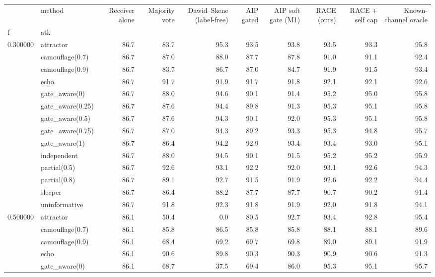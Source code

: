 \begin{tabular}{llrrrrrrrr}
\toprule
 & method & Receiver alone & Majority vote & Dawid–Skene (label-free) & AIP gated & AIP soft gate (M1) & RACE (ours) & RACE + self cap & Known-channel oracle \\
f & atk &  &  &  &  &  &  &  &  \\
\midrule
\multirow[t]{14}{*}{0.300000} & attractor & 86.7 & 83.7 & 95.3 & 93.5 & 93.8 & 93.5 & 93.3 & 95.8 \\
 & camouflage(0.7) & 86.7 & 87.0 & 88.0 & 87.7 & 87.8 & 91.0 & 91.1 & 92.4 \\
 & camouflage(0.9) & 86.7 & 83.7 & 86.7 & 87.0 & 84.7 & 91.9 & 91.5 & 93.4 \\
 & echo & 86.7 & 91.7 & 91.9 & 91.7 & 91.8 & 92.1 & 92.1 & 92.6 \\
 & gate\_aware(0) & 86.7 & 88.0 & 94.6 & 90.1 & 91.4 & 95.2 & 95.0 & 95.8 \\
 & gate\_aware(0.25) & 86.7 & 87.6 & 94.4 & 89.8 & 91.3 & 95.3 & 95.1 & 95.8 \\
 & gate\_aware(0.5) & 86.7 & 87.6 & 94.3 & 90.1 & 92.0 & 95.3 & 95.1 & 95.8 \\
 & gate\_aware(0.75) & 86.7 & 87.0 & 94.3 & 89.2 & 93.3 & 95.3 & 94.8 & 95.7 \\
 & gate\_aware(1) & 86.7 & 86.4 & 94.2 & 92.9 & 93.4 & 93.4 & 93.0 & 95.1 \\
 & independent & 86.7 & 88.0 & 94.5 & 90.1 & 91.5 & 95.2 & 95.2 & 95.9 \\
 & partial(0.5) & 86.7 & 92.6 & 93.1 & 92.2 & 92.0 & 93.1 & 92.6 & 94.3 \\
 & partial(0.8) & 86.7 & 89.1 & 92.7 & 91.5 & 91.9 & 92.6 & 92.2 & 94.4 \\
 & sleeper & 86.7 & 86.4 & 88.2 & 87.7 & 87.7 & 90.7 & 90.2 & 91.4 \\
 & uninformative & 86.7 & 91.8 & 92.3 & 91.8 & 91.9 & 92.0 & 91.8 & 94.1 \\
\cline{1-10}
\multirow[t]{14}{*}{0.500000} & attractor & 86.1 & 50.4 & 0.0 & 80.5 & 92.7 & 93.4 & 92.8 & 95.4 \\
 & camouflage(0.7) & 86.1 & 85.8 & 86.5 & 85.8 & 85.8 & 88.1 & 88.1 & 89.6 \\
 & camouflage(0.9) & 86.1 & 68.4 & 69.2 & 69.7 & 69.8 & 89.0 & 89.1 & 91.9 \\
 & echo & 86.1 & 90.6 & 89.8 & 90.3 & 90.3 & 90.9 & 90.6 & 91.3 \\
 & gate\_aware(0) & 86.1 & 68.7 & 37.5 & 69.4 & 86.0 & 95.3 & 95.1 & 95.7 \\

\end{tabular}
